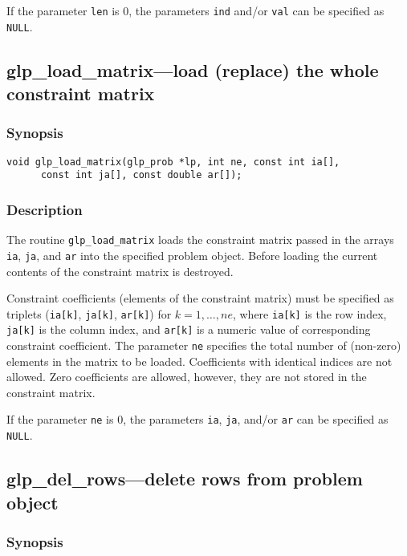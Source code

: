 If the parameter \verb|len| is 0, the parameters \verb|ind| and/or
\verb|val| can be specified as \verb|NULL|.

\subsection{glp\_load\_matrix---load (replace) the whole constraint
matrix}

\subsubsection*{Synopsis}

\begin{verbatim}
void glp_load_matrix(glp_prob *lp, int ne, const int ia[],
      const int ja[], const double ar[]);
\end{verbatim}

\subsubsection*{Description}

The routine \verb|glp_load_matrix| loads the constraint matrix passed
in  the arrays \verb|ia|, \verb|ja|, and \verb|ar| into the specified
problem object. Before loading the current contents of the constraint
matrix is destroyed.

Constraint coefficients (elements of the constraint matrix) must be
specified as triplets (\verb|ia[k]|, \verb|ja[k]|, \verb|ar[k]|) for
$k=1,\dots,ne$, where \verb|ia[k]| is the row index, \verb|ja[k]| is
the column index, and \verb|ar[k]| is a numeric value of corresponding
constraint coefficient. The parameter \verb|ne| specifies the total
number of (non-zero) elements in the matrix to be loaded. Coefficients
with identical indices are not allowed. Zero coefficients are allowed,
however, they are not stored in the constraint matrix.

If the parameter \verb|ne| is 0, the parameters \verb|ia|, \verb|ja|,
and/or \verb|ar| can be specified as \verb|NULL|.

\subsection{glp\_del\_rows---delete rows from problem object}

\subsubsection*{Synopsis}

